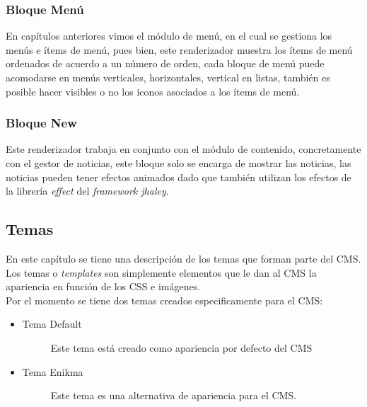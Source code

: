 \subsubsection{Bloque Men\'u}
En cap\'itulos anteriores vimos el m\'odulo de men\'u, en el cual se gestiona los men\'us e \'items de men\'u, pues bien, este renderizador muestra los \'items de men\'u ordenados de acuerdo a un n\'umero de orden, cada bloque de men\'u puede acomodarse en men\'us verticales, horizontales, vertical en listas, tambi\'en es posible hacer visibles o no los iconos asociados a los \'items de men\'u.

\subsubsection{Bloque New}
Este renderizador trabaja en conjunto con el m\'odulo de contenido, concretamente con el gestor de noticias, este bloque solo se encarga de mostrar las noticias, las noticias pueden tener efectos animados dado que tambi\'en utilizan los efectos de la librer\'ia \textit{effect} del \textit{framework jhaley}.

\subsection{Temas}
En este cap\'itulo se tiene una descripci\'on de los temas que forman parte del CMS. Los temas o \textit{templates} son simplemente elementos que le dan al CMS la apariencia en funci\'on de los CSS e im\'agenes.\\
Por el momento se tiene dos temas creados especificamente para el CMS:

\begin{itemize}
\item \begin{description}
	\item[Tema Default] Este tema est\'a creado como apariencia por defecto del CMS
\end{description}
\item \begin{description}
	\item[Tema Enikma] Este tema es una alternativa de apariencia para el CMS.
\end{description}
\end{itemize}

